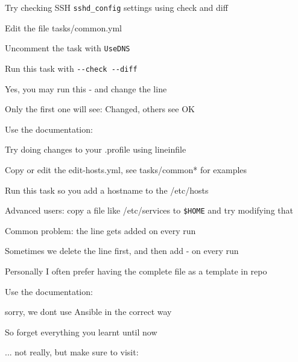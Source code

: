 \documentclass[18pt,landscape,a4paper,footrule]{foils}
\begin{document}
Try checking SSH \verb+sshd_config+ settings using check and diff

\begin{list2}
\item Edit the file tasks/common.yml
\item Uncomment the task with \verb+UseDNS+
\item Run this task with \verb+--check --diff+
\item Yes, you may run this - and change the line
\item Only the first one will see: Changed, others see OK
\end{list2}

Use the documentation:\\





Try doing changes to your .profile using lineinfile

\begin{list2}
\item Copy or edit the edit-hosts.yml, see tasks/common* for examples
\item Run this task so you add a hostname to the /etc/hosts
\item Advanced users: copy a file like /etc/services to \verb+$HOME+ and try modifying that
\item Common problem: the line gets added on every run
\item Sometimes we delete the line first, and then add - on every run
\item Personally I often prefer having the complete file as a template in repo\\
\end{list2}

Use the documentation:\\



sorry, we dont use Ansible in the correct way

So forget everything you learnt until now \smiley

... not really, but make sure to visit:\\


\end{document}
